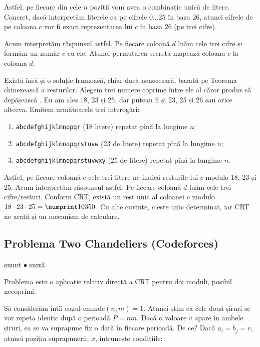 \documentclass[../main.tex]{subfiles}
\begin{document}
Astfel, pe fiecare din cele $n$ poziții vom avea o combinație unică de litere. Concret, dacă interpretăm literele ca pe cifrele $0 \dots 25$ în baza 26, atunci cifrele de pe coloana $c$ vor fi exact reprezentarea lui $c$ în baza 26 (pe trei cifre).

Acum interpretăm răspunsul astfel. Pe fiecare coloană $d$ luăm cele trei cifre și formăm un număr $c$ cu ele. Atunci permutarea secretă mapează coloana $c$ la coloana $d$.

Există însă și o soluție frumoasă, chiar dacă nenecesară, bazată pe Teorema chinezească a resturilor. Alegem trei numere coprime între ele al căror produs să depășească . Eu am ales 18, 23 și 25, dar puteau fi și 23, 25 și 26 sau orice altceva. Emitem următoarele trei interogări:

\begin{enumerate}
  \item \texttt{abcdefghijklmnopqr} (18 litere) repetat pînă la lungime $n$;
  \item \texttt{abcdefghijklmnopqrstuvw} (23 de litere) repetat pînă la lungime $n$;
  \item \texttt{abcdefghijklmnopqrstuvwxy} (25 de litere) repetat pînă la lungime $n$.
\end{enumerate}

Astfel, pe fiecare coloană $c$ cele trei litere ne indică resturile lui $c$ modulo 18, 23 și 25. Acum interpretăm răspunsul astfel. Pe fiecare coloană $d$ luăm cele trei cifre/resturi. Conform CRT, există un rest unic al coloanei $c$ modulo $18 \cdot 23 \cdot 25 = \np{10350}$. Cu alte cuvinte, $c$ este unic determinat, iar CRT ne arată și un mecanism de calculare.


\subsection{Problema Two Chandeliers (Codeforces)}
\label{problem:two-chandeliers}

\href{https://codeforces.com/contest/1500/problem/B}{enunț}
$\bullet$
\hyperref[code:two-chandeliers]{sursă}

Problema este o aplicație relativ directă a CRT pentru doi moduli, posibil necoprimi.

Să considerăm întîi cazul $\text{cmmdc}(n, m) = 1$. Atunci știm că cele două șiruri se vor repeta identic după o perioadă $P = nm$. Dacă o valoare $v$ apare în ambele șiruri, ea se va suprapune fix o dată în fiecare perioadă. De ce? Dacă $a_i = b_j = v$, atunci poziția suprapunerii, $x$, întrunește condițiile:
\end{document}
